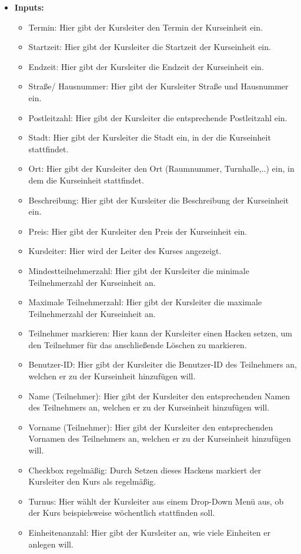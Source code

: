 \begin{itemize}
				
			\item \textbf{Inputs:}
				\begin{itemize}
					\item Termin: Hier gibt der Kursleiter den Termin der Kurseinheit ein.
					\item Startzeit: Hier gibt der Kursleiter die Startzeit der Kurseinheit ein.
					\item Endzeit: Hier gibt der Kursleiter die Endzeit der Kurseinheit ein.
					\item Straße/ Hausnummer: Hier gibt der Kursleiter Straße und Hausnummer ein.
					\item Postleitzahl: Hier gibt der Kursleiter die entsprechende Postleitzahl ein.
					\item Stadt: Hier gibt der Kursleiter die Stadt ein, in der die Kurseinheit stattfindet.
					\item Ort: Hier gibt der Kursleiter den Ort (Raumnummer, Turnhalle,..) ein, in dem die Kurseinheit stattfindet.
					\item Beschreibung: Hier gibt der Kursleiter die Beschreibung der Kurseinheit ein.
					\item Preis: Hier gibt der Kursleiter den Preis der Kurseinheit ein.
					\item Kursleiter: Hier wird der Leiter des Kurses angezeigt.
					\item Mindestteilnehmerzahl: Hier gibt der Kursleiter die minimale Teilnehmerzahl der Kurseinheit an.
					\item Maximale Teilnehmerzahl: Hier gibt der Kursleiter die maximale Teilnehmerzahl der Kurseinheit an.
					\item Teilnehmer markieren: Hier kann der Kursleiter einen Hacken setzen, um den Teilnehmer für das anschließende Löschen zu markieren.
					\item Benutzer-ID: Hier gibt der Kursleiter die Benutzer-ID des Teilnehmers an, welchen er zu der Kurseinheit hinzufügen will.
					\item Name (Teilnehmer): Hier gibt der Kursleiter den entsprechenden Namen des Teilnehmers an, welchen er zu der Kurseinheit hinzufügen will.
					\item Vorname (Teilnehmer): Hier gibt der Kursleiter den entsprechenden Vornamen des Teilnehmers an, welchen er zu der Kurseinheit hinzufügen will.
					\item Checkbox regelmäßig: Durch Setzen dieses Hackens markiert der Kursleiter den Kurs als regelmäßig.
					\item Turnus: Hier wählt der Kursleiter aus einem Drop-Down Menü aus, ob der Kurs beispielsweise wöchentlich stattfinden soll.
					\item Einheitenanzahl: Hier gibt der Kursleiter an, wie viele Einheiten er anlegen will.
				\end{itemize}
				

\end{itemize}
